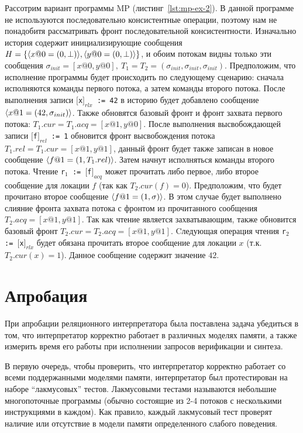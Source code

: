 Рассотрим вариант программы MP (листинг~\ref{lst:mp-ex-2}).
В данной программе не используются последовательно консистентные операции,
поэтому нам не понадобитя рассматривать фронт последовательной консистентности.
Изначально история содержит инициализирующие сообщения 
$H = \{{\langle x@0=(0, \bot) \rangle}, {\langle y@0=(0, \bot) \rangle}\}$,
и обоим потокам видны только эти сообщения 
$\sigma_{init} = [x@0, y@0], ~ T_1 = T_2 = (\sigma_{init}, \sigma_{init}, \sigma_{init})$.
Предположим, что исполнение программы будет происходить по следующему сценарию:
сначала исполняются команды первого потока, а затем команды второго потока.
После выполнения записи \texttt{$[$x$]_{rlx}$ := 42} 
в историю будет добавлено сообщение ${\langle x@1=(42, \sigma_{init}) \rangle}$.
Также обновятся базовый фронт и фронт захвата первого потока:
$T_1.cur = T_1.acq = [x@1, y@0]$.
После выполнения высвобождающей записи \texttt{$[$f$]_{rel}$ := 1} 
обновится фронт высвобождения потока $T_1.rel = T_1.cur = [x@1, y@1]$,
данный фронт будет также записан в новое сообщение 
${\langle f@1=(1, T_1.rel) \rangle}$.
Затем начнут исполняться команды второго потока.
Чтение \texttt{r$_1$ := $[$f$]_{acq}$}
может прочитать либо первое, либо второе сообщение
для локации $f$ (так как $T_2.cur(f) = 0$).
Предположим, что будет прочитано второе сообщение ${\langle f@1=(1, \sigma) \rangle}$.
В этом случае будет выполнено слияние фронта захвата потока с фронтом из прочитанного сообщения
$T_2.acq = [x@1, y@1]$.
Так как чтение является захватывающим, 
также обновится базовый фронт $T_2.cur = T_2.acq = [x@1, y@1]$.
Cледующая операция чтения \texttt{r$_2$ := $[$x$]_{rlx}$}
будет обязана прочитать второе сообщение для локации $x$
(т.к. $T_2.cur(x) = 1$).
Данное сообщение содержит значение $42$.

\section{Апробация}

При апробации реляционного интерпретатора была поставлена задача убедиться в том, 
что интерпретатор корректно работает в различных моделях памяти,
а также измерить время его работы при исполнении запросов верификации и синтеза.

В первую очередь, чтобы проверить, что 
интерпретатор корректно работает со всеми поддержанными 
моделями памяти, интерпретатор был протестирован на наборе ``лакмусовых'' тестов. 
Лакмусовыми тестами называются небольшие многопоточные программы
(обычно состоящие из 2-4 потоков с несколькими инструкциями в каждом).
Как правило, каждый лакмусовый тест проверят наличие или отсутствие в модели памяти
определенного слабого поведения.

